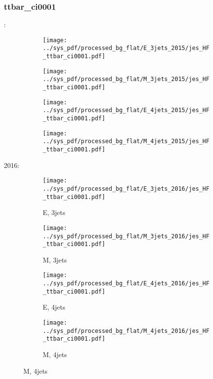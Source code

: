 \documentclass{beamer}
\begin{document}
\begin{frame}
\frametitle{ttbar_ci0001}
\fontsize{5}{1}:
\begin{figure}
\centering
\begin{subfigure}[b]{0.24\textwidth}
\texttt{[image: ../sys\_pdf/processed\_bg\_flat/E\_3jets\_2015/jes\_HF\_ttbar\_ci0001.pdf]}
\end{subfigure}
\begin{subfigure}[b]{0.24\textwidth}
\texttt{[image: ../sys\_pdf/processed\_bg\_flat/M\_3jets\_2015/jes\_HF\_ttbar\_ci0001.pdf]}
\end{subfigure}
\begin{subfigure}[b]{0.24\textwidth}
\texttt{[image: ../sys\_pdf/processed\_bg\_flat/E\_4jets\_2015/jes\_HF\_ttbar\_ci0001.pdf]}
\end{subfigure}
\begin{subfigure}[b]{0.24\textwidth}
\texttt{[image: ../sys\_pdf/processed\_bg\_flat/M\_4jets\_2015/jes\_HF\_ttbar\_ci0001.pdf]}
\end{subfigure}
\end{figure}
2016:
\begin{figure}
\centering
\begin{subfigure}[b]{0.24\textwidth}
\texttt{[image: ../sys\_pdf/processed\_bg\_flat/E\_3jets\_2016/jes\_HF\_ttbar\_ci0001.pdf]}
\captionsetup{font=tiny}
\caption{E, 3jets}
\end{subfigure}
\begin{subfigure}[b]{0.24\textwidth}
\texttt{[image: ../sys\_pdf/processed\_bg\_flat/M\_3jets\_2016/jes\_HF\_ttbar\_ci0001.pdf]}
\captionsetup{font=tiny}
\caption{M, 3jets}
\end{subfigure}
\begin{subfigure}[b]{0.24\textwidth}
\texttt{[image: ../sys\_pdf/processed\_bg\_flat/E\_4jets\_2016/jes\_HF\_ttbar\_ci0001.pdf]}
\captionsetup{font=tiny}
\caption{E, 4jets}
\end{subfigure}
\begin{subfigure}[b]{0.24\textwidth}
\texttt{[image: ../sys\_pdf/processed\_bg\_flat/M\_4jets\_2016/jes\_HF\_ttbar\_ci0001.pdf]}
\captionsetup{font=tiny}
\caption{M, 4jets}
\end{subfigure}
\end{figure}
\end{frame}
\end{document}
